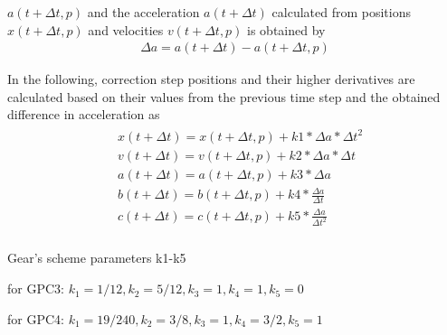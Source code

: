 $a(t+ \Delta{t}, p)$ and the acceleration $a(t+\Delta{t})$ calculated from positions $x(t+\Delta{t},
p)$ and velocities $v(t+\Delta{t}, p)$ is obtained by
\begin{align}\label{eqn:gearDa}
    \Delta{a} = a(t + \Delta{t}) - a(t + \Delta{t}, p)
\end{align}
\par
In the following, correction step positions and their higher derivatives are calculated based on
their values from the previous time step and the obtained difference in acceleration as
\begin{align}\label{eqn:gearCorrector}
    \begin{split}
        &x(t+\Delta{t}) = x(t+\Delta{t}, p) + k1 * \Delta{a} * \Delta{t}^2\\
        &v(t+\Delta{t}) = v(t+\Delta{t}, p) + k2 * \Delta{a} * \Delta{t}\\
        &a(t+\Delta{t}) = a(t+\Delta{t}, p) + k3 * \Delta{a}\\
        &b(t+\Delta{t}) = b(t+\Delta{t}, p) + k4 * \frac{\Delta{a}}{\Delta{t}}\\
        &c(t+\Delta{t}) = c(t+\Delta{t}, p) + k5 * \frac{\Delta{a}}{\Delta{t}^2}\\
    \end{split}
\end{align}
\par
Gear’s scheme parameters k1-k5\par
for GPC3:
$k_1 = 1/12, k_2 = 5/12, k_3 = 1, k_4 = 1, k_5 = 0$\par
for GPC4:
$k_1 = 19/240, k_2 = 3/8, k_3 = 1, k_4 = 3/2, k_5 = 1$
\par
\newpage
